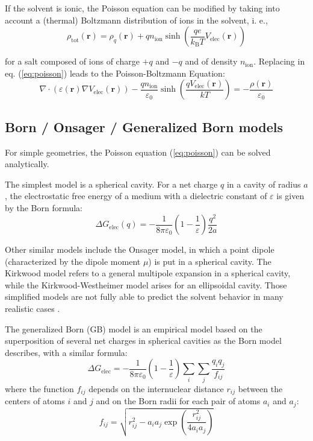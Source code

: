 If the solvent is ionic, the Poisson equation can be modified by taking
into account a (thermal) Boltzmann distribution of ions in the solvent,
i. e.,
\begin{equation}
\rho_{\mathrm{tot}}(\mathbf{r})=\rho_{q}(\mathbf{r})+qn_{\mathrm{ion}}\sinh(\frac{qe}{k_{\mathrm{B}}T}V_{\mathrm{elec}}(\mathbf{r}))
\end{equation}

for a salt composed of ions of charge $+q$ and $-q$ and of density
$n_{\mathrm{ion}}$. Replacing in eq. (\ref{eq:poisson}) leads to
the Poisson-Boltzmann Equation:
\begin{equation}
\nabla\cdot(\varepsilon(\mathbf{r})\nabla V_{\mathrm{elec}}(\mathbf{r}))-\dfrac{qn_{\mathrm{ion}}}{\varepsilon_{0}}\sinh\left(\dfrac{qV_{\mathrm{elec}}(\mathbf{r})}{kT}\right)=-\dfrac{\rho(\mathbf{r})}{\varepsilon_{0}}
\end{equation}


\subsection{Born / Onsager / Generalized Born models\label{subsec:Born-/-Onsager}}

For simple geometries, the Poisson equation (\ref{eq:poisson}) can
be solved analytically.

The simplest model is a spherical cavity. For a net charge $q$ in
a cavity of radius $a$, the electrostatic free energy of a medium
with a dielectric constant of $\varepsilon$ is given by the Born
formula:
\begin{equation}
\Delta G_{\mathrm{elec}}(q)=-\dfrac{1}{8\pi\varepsilon_{0}}\left(1-\frac{1}{\varepsilon}\right)\frac{q^{2}}{2a}
\end{equation}

Other similar models include the Onsager model, in which a point dipole
(characterized by the dipole moment $\mu$) is put in a spherical
cavity. The Kirkwood model refers to a general multipole expansion
in a spherical cavity, while the Kirkwood-Westheimer model arises
for an ellipsoidal cavity. Those simplified models are not fully able
to predict the solvent behavior in many realistic cases \citep{Jensen}. 

The generalized Born (GB) model is an empirical model based on the
superposition of several net charges in spherical cavities as the
Born model describes, with a similar formula:
\begin{equation}
\Delta G_{\mathrm{elec}}=-\dfrac{1}{8\pi\varepsilon_{0}}\left(1-\frac{1}{\varepsilon}\right)\sum_{i}\sum_{j}\frac{q_{i}q_{j}}{f_{ij}}
\end{equation}
where the function $f_{ij}$ depends on the internuclear distance
$r_{ij}$ between the centers of atoms $i$ and $j$ and on the Born
radii for each pair of atoms $a_{i}$ and $a_{j}$:
\begin{equation}
f_{ij}=\sqrt{r_{ij}^{2}-a_{i}a_{j}\exp\left(\frac{r_{ij}^{2}}{4a_{i}a_{j}}\right)}
\end{equation}

